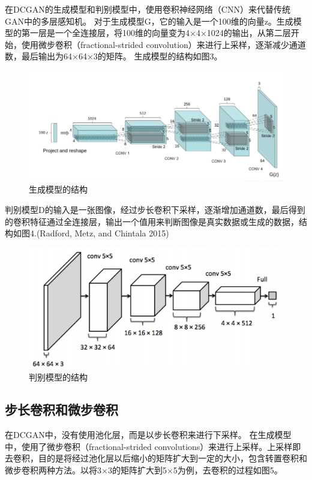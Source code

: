 \documentclass[
  hyperref, a4paper]{ctexart}
\begin{document}
在DCGAN的生成模型和判别模型中，使用卷积神经网络（CNN）来代替传统GAN中的多层感知机。
对于生成模型G，它的输入是一个100维的向量z。生成模型的第一层是一个全连接层，将100维的向量变为4×4×1024的输出，从第二层开始，使用微步卷积（fractional-strided
convolution）来进行上采样，逐渐减少通道数，最后输出为64×64×3的矩阵。
生成模型的结构如图3。

\begin{figure}
\centering
\includegraphics{3.png}
\caption{生成模型的结构}
\end{figure}

判别模型D的输入是一张图像，经过步长卷积下采样，逐渐增加通道数，最后得到的卷积特征通过全连接层，输出一个值用来判断图像是真实数据或生成的数据，结构如图4.(Radford,
Metz, and Chintala 2015)

\begin{figure}
\centering
\includegraphics{4.png}
\caption{判别模型的结构}
\end{figure}

\hypertarget{ux6b65ux957fux5377ux79efux548cux5faeux6b65ux5377ux79ef}{%
\subsection{步长卷积和微步卷积}\label{ux6b65ux957fux5377ux79efux548cux5faeux6b65ux5377ux79ef}}

在DCGAN中，没有使用池化层，而是以步长卷积来进行下采样。
在生成模型中，使用了微步卷积（fractional-strided
convolutions）来进行上采样。上采样即去卷积，目的是将经过池化层以后缩小的矩阵扩大到一定的大小，包含转置卷积和微步卷积两种方法。以将3×3的矩阵扩大到5×5为例，去卷积的过程如图5。
\end{document}
